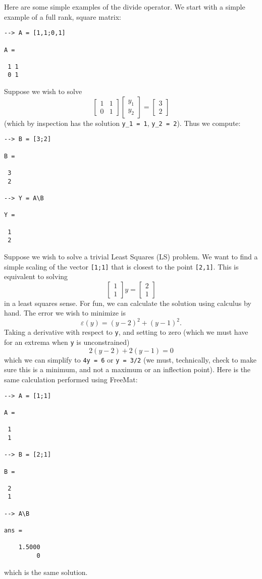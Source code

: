 Here are some simple examples of the divide operator.  We start with a simple example of a full rank, square matrix:
\begin{verbatim}
--> A = [1,1;0,1]

A = 

 1 1 
 0 1 
\end{verbatim}
Suppose we wish to solve
\[
  \begin{bmatrix} 1 & 1 \\ 0 & 1 \end{bmatrix}
  \begin{bmatrix} y_1 \\ y_2 \end{bmatrix}
 = 
  \begin{bmatrix} 3 \\ 2 \end{bmatrix}
\]
(which by inspection has the solution \verb|y_1 = 1|, \verb|y_2 = 2|).  Thus we compute:
\begin{verbatim}
--> B = [3;2]

B = 

 3 
 2 

--> Y = A\B

Y = 

 1 
 2 
\end{verbatim}

Suppose we wish to solve a trivial Least Squares (LS) problem.  We want to find a simple scaling of the vector \verb|[1;1]| that is closest to the point \verb|[2,1]|.  This is equivalent to solving
\[
\begin{bmatrix} 1 \\ 1 \end{bmatrix} y = \begin{bmatrix} 2 \\ 1 \end{bmatrix}
\]
in a least squares sense.  For fun, we can calculate the solution using calculus by hand.  The error we wish to minimize is
\[
  \varepsilon(y) = (y - 2)^2 + (y-1)^2.
\]
Taking a derivative with respect to \verb|y|, and setting to zero (which we must have for an extrema when \verb|y| is unconstrained)
\[
  2 (y-2) + 2 (y-1) = 0
\]
which we can simplify to \verb|4y = 6| or \verb|y = 3/2| (we must, technically, check to make sure this is a minimum, and not a maximum or an inflection point).  Here is the same calculation performed using FreeMat:
\begin{verbatim}
--> A = [1;1]

A = 

 1 
 1 

--> B = [2;1]

B = 

 2 
 1 

--> A\B

ans = 

    1.5000 
         0 
\end{verbatim}
which is the same solution.
